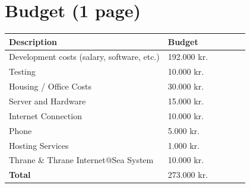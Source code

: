 \documentclass[a4paper,10pt,oneside,fleqn]{article}
\begin{document}
\section{Budget (1 page)}
\label{sec:budget}
\begin{center}
\begin{tabular}{l*{4}{l}l}
Description 	         									& Budget\\			
\hline
Development costs (salary, software, etc.) 					& 192.000 kr.\\
Testing 							 						& 10.000 kr.\\
Housing / Office Costs 		 								& 30.000 kr.\\
Server and Hardware 		 								& 15.000 kr.\\
Internet Connection 										& 10.000 kr.\\
Phone 														&  5.000 kr.\\
Hosting Services 											&  1.000 kr.\\
Thrane \& Thrane Internet@Sea System 						& 10.000 kr.\\
\hline
\textbf{Total} 												& 273.000 kr.
\end{tabular}
\end{center}
\end{document}
